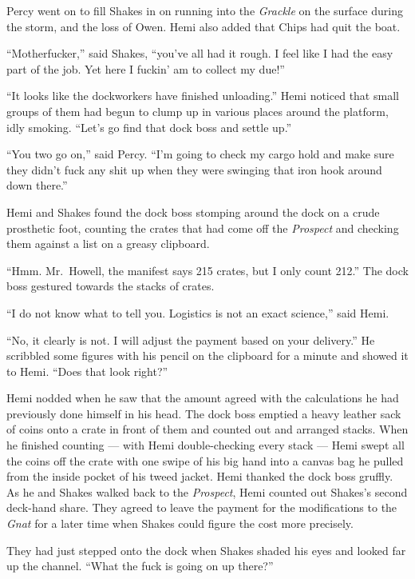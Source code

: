 \documentclass[
]{scrbook}
\begin{document}
Percy went on to fill Shakes in on running into the \emph{Grackle} on
the surface during the storm, and the loss of Owen. Hemi also added that
Chips had quit the boat.

``Motherfucker,'' said Shakes, ``you've all had it rough. I feel like I
had the easy part of the job. Yet here I fuckin' am to collect my due!''

``It looks like the dockworkers have finished unloading.'' Hemi noticed
that small groups of them had begun to clump up in various places around
the platform, idly smoking. ``Let's go find that dock boss and settle
up.''

``You two go on,'' said Percy. ``I'm going to check my cargo hold and
make sure they didn't fuck any shit up when they were swinging that iron
hook around down there.''

\bigskip

Hemi and Shakes found the dock boss stomping around the dock on a crude
prosthetic foot, counting the crates that had come off the
\emph{Prospect} and checking them against a list on a greasy clipboard.

``Hmm. Mr.~Howell, the manifest says 215 crates, but I only count 212.''
The dock boss gestured towards the stacks of crates.

``I do not know what to tell you. Logistics is not an exact science,''
said Hemi.

``No, it clearly is not. I will adjust the payment based on your
delivery.'' He scribbled some figures with his pencil on the clipboard
for a minute and showed it to Hemi. ``Does that look right?''

Hemi nodded when he saw that the amount agreed with the calculations he
had previously done himself in his head. The dock boss emptied a heavy
leather sack of coins onto a crate in front of them and counted out and
arranged stacks. When he finished counting --- with Hemi double-checking
every stack --- Hemi swept all the coins off the crate with one swipe of
his big hand into a canvas bag he pulled from the inside pocket of his
tweed jacket. Hemi thanked the dock boss gruffly. As he and Shakes
walked back to the \emph{Prospect}, Hemi counted out Shakes's second
deck-hand share. They agreed to leave the payment for the modifications
to the \emph{Gnat} for a later time when Shakes could figure the cost
more precisely.

They had just stepped onto the dock when Shakes shaded his eyes and
looked far up the channel. ``What the fuck is going on up there?''
\end{document}
